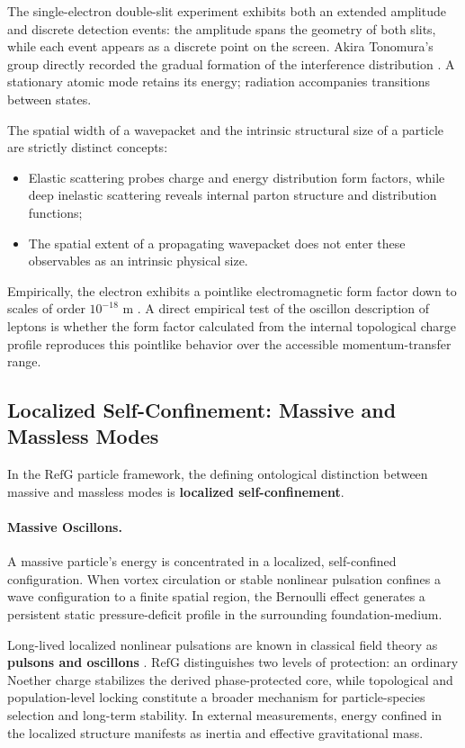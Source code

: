 \documentclass[11pt,a4paper]{article}
\newcommand{\RefG}{\mathrm{RefG}}
\begin{document}
The single-electron double-slit experiment exhibits both an extended amplitude and discrete detection events: the amplitude spans the geometry of both slits, while each event appears as a discrete point on the screen. Akira Tonomura's group directly recorded the gradual formation of the interference distribution \citep{tonomura1989}. A stationary atomic mode retains its energy; radiation accompanies transitions between states.

The spatial width of a wavepacket and the intrinsic structural size of a particle are strictly distinct concepts:
\begin{itemize}
\item Elastic scattering probes charge and energy distribution form factors, while deep inelastic scattering reveals internal parton structure and distribution functions;
\item The spatial extent of a propagating wavepacket does not enter these observables as an intrinsic physical size.
\end{itemize}

Empirically, the electron exhibits a pointlike electromagnetic form factor down to scales of order $10^{-18}\text{ m}$ \citep{navas2024}. A direct empirical test of the oscillon description of leptons is whether the form factor calculated from the internal topological charge profile reproduces this pointlike behavior over the accessible momentum-transfer range.

\subsection{Localized Self-Confinement: Massive and Massless Modes}

In the $\RefG$ particle framework, the defining ontological distinction between massive and massless modes is \textbf{localized self-confinement}.

\paragraph{Massive Oscillons.} A massive particle's energy is concentrated in a localized, self-confined configuration. When vortex circulation or stable nonlinear pulsation confines a wave configuration to a finite spatial region, the Bernoulli effect generates a persistent static pressure-deficit profile in the surrounding foundation-medium.

Long-lived localized nonlinear pulsations are known in classical field theory as \textbf{pulsons and oscillons} \citep{bogolyubsky1976,gleiser1994,copeland1995}. $\RefG$ distinguishes two levels of protection: an ordinary Noether charge stabilizes the derived phase-protected core, while topological and population-level locking constitute a broader mechanism for particle-species selection and long-term stability. In external measurements, energy confined in the localized structure manifests as inertia and effective gravitational mass.
\end{document}
